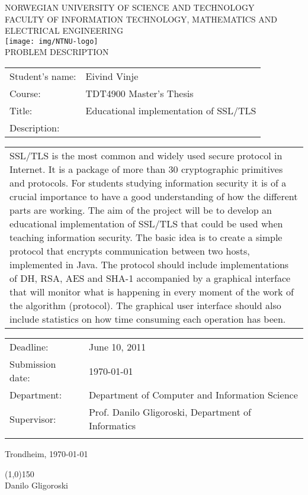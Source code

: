 \documentclass[12pt,a4paper,titlepage]{report}
\begin{document}
\begin{center}
\textsc{NORWEGIAN UNIVERSITY OF SCIENCE AND TECHNOLOGY\\
FACULTY OF  INFORMATION TECHNOLOGY, MATHEMATICS AND ELECTRICAL ENGINEERING} \\
\vspace{0.5cm} 
\texttt{[image: img/NTNU-logo]} \\

\vspace{1.0cm}
{\Huge{PROBLEM DESCRIPTION}}
\vspace{1.0cm}

\begin{tabular}{ p{4cm} p{11cm}}
Student's name:	& Eivind Vinje \\
Course: & TDT4900 Master's Thesis \\
Title: & Educational implementation of SSL/TLS \\
Description: & \\
\end{tabular}
{\small{\begin{tabular}{p{15cm}}
\vspace{0.2cm}
SSL/TLS is the most common and widely used secure protocol in Internet. It is a package of more than 30 cryptographic primitives and protocols. For students studying information security it is of a crucial importance to have a good understanding of how the different parts are working. The aim of the project will be to develop an educational implementation of SSL/TLS that could be used when teaching information security. The basic idea is to create a simple protocol that encrypts communication between two hosts, implemented in Java. The protocol should include implementations of DH, RSA, AES and SHA-1 accompanied by a graphical interface that will monitor what is happening in every moment of the work of the algorithm (protocol). The graphical user interface should also include statistics on how time consuming each operation has been.
\end{tabular}  }}

\begin{tabular}{ p{4cm} p{11cm}}
Deadline: & June 10, 2011 \\
Submission date: & \today \\
Department: & Department of Computer and Information Science \\
Supervisor: & Prof. Danilo Gligoroski, Department of Informatics\\\\
\end{tabular}
\vspace{0.5cm}

Trondheim, \today 

\vspace{1cm}
\line(1,0){150} \\
Danilo Gligoroski
\end{center}
\end{document}
